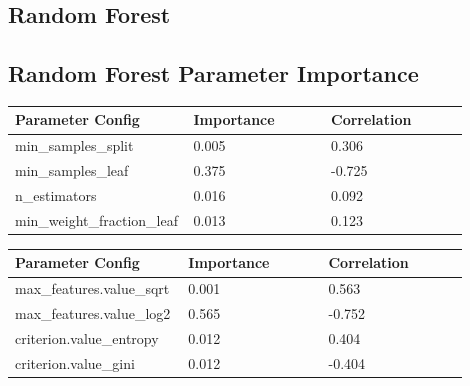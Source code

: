 \documentclass[11pt]{article}
\begin{document}
\begin{appendices}
\FloatBarrier
\newpage
\section{Random Forest}

\subsection{Random Forest Parameter Importance}
  \begin{table}[ht]
    \centering
    \begin{tabular}{|p{0.3\linewidth} | p{0.3\linewidth}| p{0.3\linewidth}|} 
      \hline
      \textbf{Parameter Config}  & \textbf{Importance} & \textbf{Correlation} \\ \hline
        min\_samples\_split & 0.005 & 0.306 \\ \hline
        min\_samples\_leaf & 0.375 & -0.725 \\ \hline
        n\_estimators & 0.016 & 0.092 \\ \hline
        min\_weight\_fraction\_leaf & 0.013 & 0.123 \\ \hline
    \end{tabular}
  \end{table}\label{RF_ParamImp1}

  \begin{table}[ht]
    \centering
    \begin{tabular}{|p{0.3\linewidth} | p{0.3\linewidth}| p{0.3\linewidth}|} 
      \hline
      \textbf{Parameter Config}  & \textbf{Importance} & \textbf{Correlation} \\ \hline
      max\_features.value\_sqrt & 0.001 & 0.563 \\ \hline
      max\_features.value\_log2 & 0.565 & -0.752 \\ \hline
      criterion.value\_entropy & 0.012 & 0.404 \\ \hline
      criterion.value\_gini & 0.012 & -0.404 \\ \hline
    \end{tabular}
  \end{table}\label{RF_ParamImp2}


\end{appendices}
\end{document}
